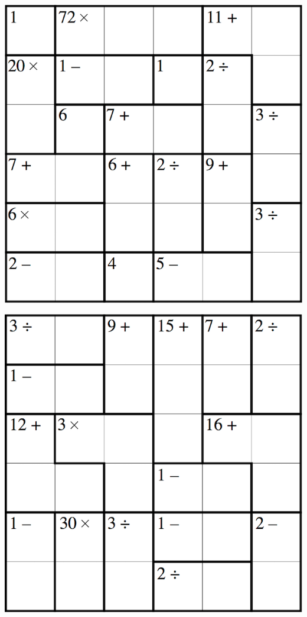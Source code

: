
\includegraphics[scale=1]{Gambar/Lampiran/6x6_7.png}

\includegraphics[scale=1]{Gambar/Lampiran/6x6_8.png}
